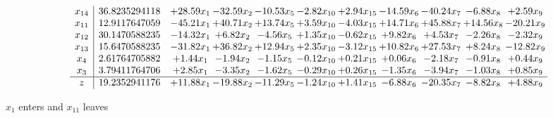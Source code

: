 \documentclass[9pt]{article}
\begin{document}
 \[\begin{array}{c| c c@{\hskip 2pt} c@{\hskip 2pt} c@{\hskip 2pt} c@{\hskip 2pt} c@{\hskip 2pt} c@{\hskip 2pt} c@{\hskip 2pt} c@{\hskip 2pt} c@{\hskip 2pt} }
 x_{14}   &  36.8235294118 & + 28.59 x_{1} & -32.59 x_{2} & -10.53 x_{5} & -2.82 x_{10} & +  2.94 x_{15} & -14.59 x_{6} & -40.24 x_{7} & -6.88 x_{8} & +  2.59 x_{9}\\
 x_{11}   &  12.9117647059 & -45.21 x_{1} & + 40.71 x_{2} & + 13.74 x_{5} & +  3.59 x_{10} & -4.03 x_{15} & + 14.71 x_{6} & + 45.88 x_{7} & + 14.56 x_{8} & -20.21 x_{9}\\
 x_{12}   &  30.1470588235 & -14.32 x_{1} & +  6.82 x_{2} & -4.56 x_{5} & +  1.35 x_{10} & -0.62 x_{15} & +  9.82 x_{6} & +  4.53 x_{7} & -2.26 x_{8} & -2.32 x_{9}\\
 x_{13}   &  15.6470588235 & -31.82 x_{1} & + 36.82 x_{2} & + 12.94 x_{5} & +  2.35 x_{10} & -3.12 x_{15} & + 10.82 x_{6} & + 27.53 x_{7} & +  8.24 x_{8} & -12.82 x_{9}\\
 x_{4}   &  2.61764705882 & +  1.44 x_{1} & -1.94 x_{2} & -1.15 x_{5} & -0.12 x_{10} & +  0.21 x_{15} & +  0.06 x_{6} & -2.18 x_{7} & -0.91 x_{8} & +  0.44 x_{9}\\
 x_{3}   &  3.79411764706 & +  2.85 x_{1} & -3.35 x_{2} & -1.62 x_{5} & -0.29 x_{10} & +  0.26 x_{15} & -1.35 x_{6} & -3.94 x_{7} & -1.03 x_{8} & +  0.85 x_{9}\\
\hline
z    &  19.2352941176 & + 11.88 x_{1} & -19.88 x_{2} & -11.29 x_{5} & -1.24 x_{10} & +  1.41 x_{15} & -6.88 x_{6} & -20.35 x_{7} & -8.82 x_{8} & +  4.88 x_{9}\\
\end{array}\]


 $ x_{1} $ enters and $ x_{11} $ leaves 
\end{document}
